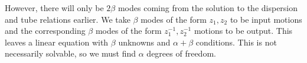 \documentclass[12pt]{article}
\begin{document}
However, there will only be $2\beta$ modes coming from the solution to the dispersion and tube relations earlier. We take $\beta$ modes of the form ${z_1, z_2}$ to be input motions and the corresponding $\beta$ modes of the form ${z_1^{-1}, z_2^{-1}}$ motions to be output. This leaves a linear equation with $\beta$ unknowns and $\alpha+\beta$ conditions. This is not necessarily solvable, so we must find $\alpha$ degrees of freedom. 

\centerline{}
\centerline{}
\end{document}
